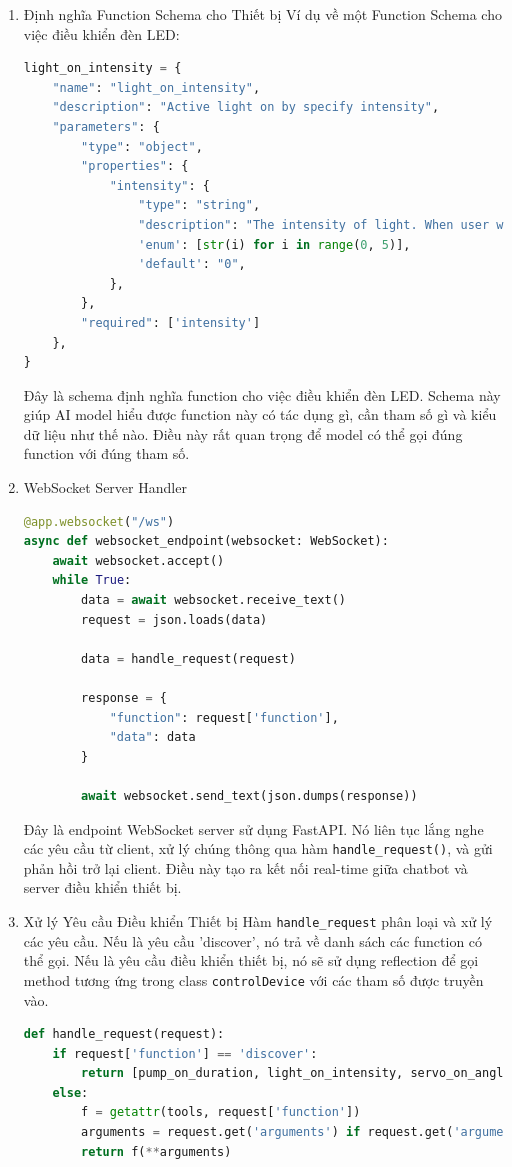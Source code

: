 \begin{enumerate}
    \item Định nghĩa Function Schema cho Thiết bị \newline
    Ví dụ về một Function Schema cho việc điều khiển đèn LED:
    \begin{lstlisting}[language=Python]
light_on_intensity = {
    "name": "light_on_intensity",
    "description": "Active light on by specify intensity",
    "parameters": {
        "type": "object",
        "properties": {
            "intensity": {
                "type": "string",
                "description": "The intensity of light. When user want to turn off light, agent set the intensity to 0",
                'enum': [str(i) for i in range(0, 5)],
                'default': "0",
            },
        },
        "required": ['intensity']
    },
}
    \end{lstlisting}
    Đây là schema định nghĩa function cho việc điều khiển đèn LED. Schema này giúp AI model hiểu được function này có tác dụng gì, cần tham số gì và kiểu dữ liệu như thế nào. Điều này rất quan trọng để model có thể gọi đúng function với đúng tham số.

    \item WebSocket Server Handler \newline
    \begin{lstlisting}[language=Python]
@app.websocket("/ws")
async def websocket_endpoint(websocket: WebSocket):
    await websocket.accept()
    while True:
        data = await websocket.receive_text()
        request = json.loads(data)
        
        data = handle_request(request)
        
        response = {
            "function": request['function'],
            "data": data
        }
        
        await websocket.send_text(json.dumps(response))
    \end{lstlisting}
    Đây là endpoint WebSocket server sử dụng FastAPI. Nó liên tục lắng nghe các yêu cầu từ client, xử lý chúng thông qua hàm \texttt{handle\_request()}, và gửi phản hồi trở lại client. Điều này tạo ra kết nối real-time giữa chatbot và server điều khiển thiết bị.

    \item Xử lý Yêu cầu Điều khiển Thiết bị \newline
    Hàm \texttt{handle\_request} phân loại và xử lý các yêu cầu. Nếu là yêu cầu 'discover', nó trả về danh sách các function có thể gọi. Nếu là yêu cầu điều khiển thiết bị, nó sẽ sử dụng reflection để gọi method tương ứng trong class \texttt{controlDevice} với các tham số được truyền vào.
    \begin{lstlisting}[language=Python]
def handle_request(request):
    if request['function'] == 'discover':
        return [pump_on_duration, light_on_intensity, servo_on_angle]
    else:
        f = getattr(tools, request['function'])
        arguments = request.get('arguments') if request.get('arguments') != None else {}
        return f(**arguments)
    \end{lstlisting}
\end{enumerate}

